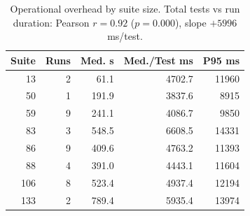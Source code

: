 \begin{table}[htbp]
\renewcommand{\arraystretch}{1.2}
\centering
\scriptsize
\setlength{\tabcolsep}{2.5pt}
\caption{Operational overhead by suite size. Total tests vs run duration: Pearson $r=0.92$ ($p=0.000$), slope $+5996$ ms/test.}
\label{tab:overhead_scaling}
\begin{tabular}{rrrrr}
\toprule
\textbf{Suite} & \textbf{Runs} & \textbf{Med. s} & \textbf{Med./Test ms} & \textbf{P95 ms} \\
\midrule
13 & 2 & 61.1 & 4702.7 & 11960 \\
50 & 1 & 191.9 & 3837.6 & 8915 \\
59 & 9 & 241.1 & 4086.7 & 9850 \\
83 & 3 & 548.5 & 6608.5 & 14331 \\
86 & 9 & 409.6 & 4763.2 & 11393 \\
88 & 4 & 391.0 & 4443.1 & 11604 \\
106 & 8 & 523.4 & 4937.4 & 12194 \\
133 & 2 & 789.4 & 5935.4 & 13974 \\
\bottomrule
\end{tabular}
\setlength{\tabcolsep}{6pt}
\end{table}
